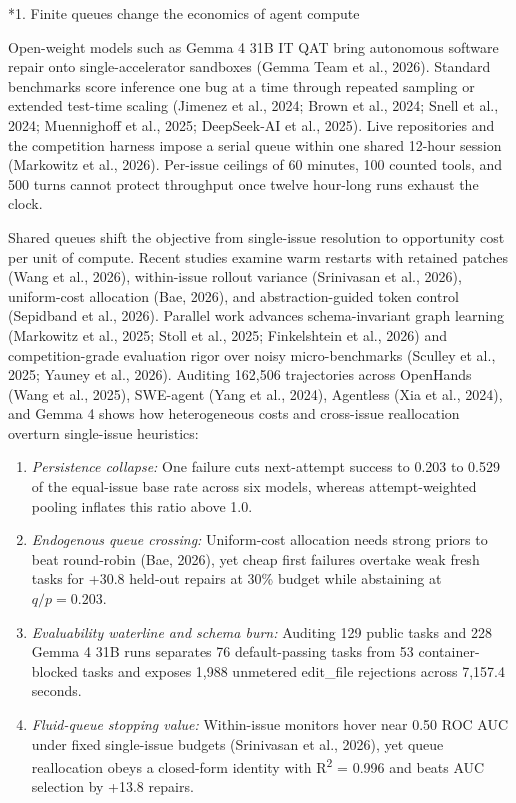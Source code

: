 \documentclass[10pt,a4paper]{article}
\makeatletter
\renewcommand{\section}{\@startsection{section}{1}{\z@}{-1.6ex plus -.2ex minus -.2ex}{.65ex}{\large\bfseries\raggedright}}
\providecommand{\tightlist}{\setlength{\itemsep}{0pt}\setlength{\parskip}{0pt}}
\makeatother
\begin{document}
\endgroup\medskip

\section*{1. Finite queues change the economics of agent compute}

Open-weight models such as Gemma 4 31B IT QAT bring autonomous software repair onto single-accelerator sandboxes (Gemma Team et al., 2026). Standard benchmarks score inference one bug at a time through repeated sampling or extended test-time scaling (Jimenez et al., 2024; Brown et al., 2024; Snell et al., 2024; Muennighoff et al., 2025; DeepSeek-AI et al., 2025). Live repositories and the competition harness impose a serial queue within one shared 12-hour session (Markowitz et al., 2026). Per-issue ceilings of 60 minutes, 100 counted tools, and 500 turns cannot protect throughput once twelve hour-long runs exhaust the clock.

Shared queues shift the objective from single-issue resolution to opportunity cost per unit of compute. Recent studies examine warm restarts with retained patches (Wang et al., 2026), within-issue rollout variance (Srinivasan et al., 2026), uniform-cost allocation (Bae, 2026), and abstraction-guided token control (Sepidband et al., 2026). Parallel work advances schema-invariant graph learning (Markowitz et al., 2025; Stoll et al., 2025; Finkelshtein et al., 2026) and competition-grade evaluation rigor over noisy micro-benchmarks (Sculley et al., 2025; Yauney et al., 2026). Auditing 162,506 trajectories across OpenHands (Wang et al., 2025), SWE-agent (Yang et al., 2024), Agentless (Xia et al., 2024), and Gemma 4 shows how heterogeneous costs and cross-issue reallocation overturn single-issue heuristics:

\begin{enumerate}
\def\labelenumi{\arabic{enumi}.}
\tightlist
\item
  \emph{Persistence collapse:} One failure cuts next-attempt success to 0.203 to 0.529 of the equal-issue base rate across six models, whereas attempt-weighted pooling inflates this ratio above 1.0.
\item
  \emph{Endogenous queue crossing:} Uniform-cost allocation needs strong priors to beat round-robin (Bae, 2026), yet cheap first failures overtake weak fresh tasks for +30.8 held-out repairs at 30\% budget while abstaining at \(q/p = 0.203\).
\item
  \emph{Evaluability waterline and schema burn:} Auditing 129 public tasks and 228 Gemma 4 31B runs separates 76 default-passing tasks from 53 container-blocked tasks and exposes 1,988 unmetered edit\_\allowbreak{}file rejections across 7,157.4 seconds.
\item
  \emph{Fluid-queue stopping value:} Within-issue monitors hover near 0.50 ROC AUC under fixed single-issue budgets (Srinivasan et al., 2026), yet queue reallocation obeys a closed-form identity with R\textsuperscript{2} = 0.996 and beats AUC selection by +13.8 repairs.
\end{enumerate}
\end{document}
